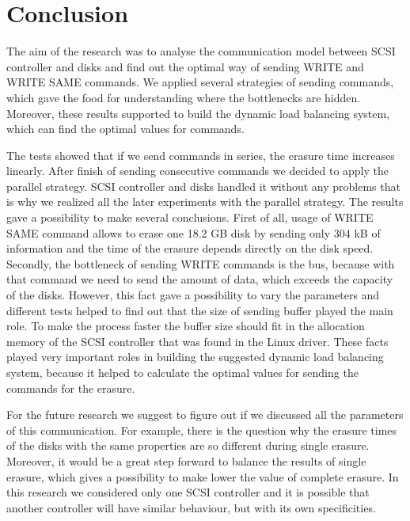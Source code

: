 \chapter{Conclusion}
\label{chap6:title}

The aim of the research was to analyse the communication model between SCSI controller and disks and find out the optimal way of sending WRITE and WRITE SAME commands. We applied several strategies of sending commands, which gave the food for understanding where the bottlenecks are hidden. Moreover, these results supported to build the dynamic load balancing system, which can find the optimal values for commands.

The tests showed that if we send commands in series, the erasure time increases linearly. After finish of sending consecutive commands we decided to apply the parallel strategy. SCSI controller and disks handled it without any problems that is why we realized all the later experiments with the parallel strategy. The results gave a possibility to make several conclusions. First of all, usage of WRITE SAME command allows to erase one 18.2 GB disk by sending only 304 kB of information and the time of the erasure depends directly on the disk speed. Secondly, the bottleneck of sending WRITE commands is the bus, because with that command we need to send the amount of data, which exceeds the capacity of the disks. However, this fact gave a possibility to vary the parameters and different tests helped to find out that the size of sending buffer played the main role. To make the process faster the buffer size should fit in the allocation memory of the SCSI controller that was found in the Linux driver. These facts played very important roles in building the suggested dynamic load balancing system, because it helped to calculate the optimal values for sending the commands for the erasure.

For the future research we suggest to figure out if we discussed all the parameters of this communication. For example, there is the question why the erasure times of the disks with the same properties are so different during single erasure. Moreover, it would be a great step forward to balance the results of single erasure, which gives a possibility to make lower the value of complete erasure. In this research we considered only one SCSI controller and it is possible that another controller will have similar behaviour, but with its own specificities.